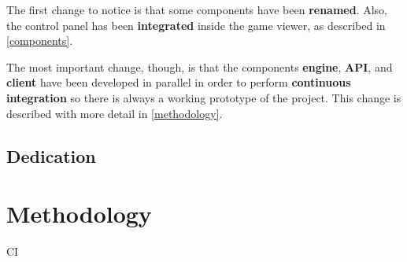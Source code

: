 \documentclass[a4paper,11pt]{article}
\begin{document}
The first change to notice is that some components have been \textbf{renamed}. Also, the control panel has been
\textbf{integrated} inside the game viewer, as described in \autoref{components}.

The most important change, though, is that the components \textbf{engine}, \textbf{API}, and \textbf{client} have been developed
in parallel in order to perform \textbf{continuous integration} so there is always a working prototype of the project.
This change is described with more detail in \autoref{methodology}.
\subsection{Dedication}
\clearpage
\section{Methodology}
\label{methodology}
CI
\clearpage


\end{document}
